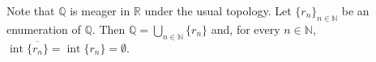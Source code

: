 \documentclass[12pt]{article}
\begin{document}
Note that $\mathbb{Q}$ is meager in $\mathbb{R}$ under the usual topology.  Let $\{r_n\}_{n \in \mathbb{N}}$ be an enumeration of $\mathbb{Q}$.  Then $\displaystyle \mathbb{Q}=\bigcup_{n \in \mathbb{N}} \{r_n\}$ and, for every $n \in \mathbb{N}$, $\operatorname{int} \overline{\{r_n\}}=\operatorname{int} \{r_n\}=\emptyset$.
\end{document}
